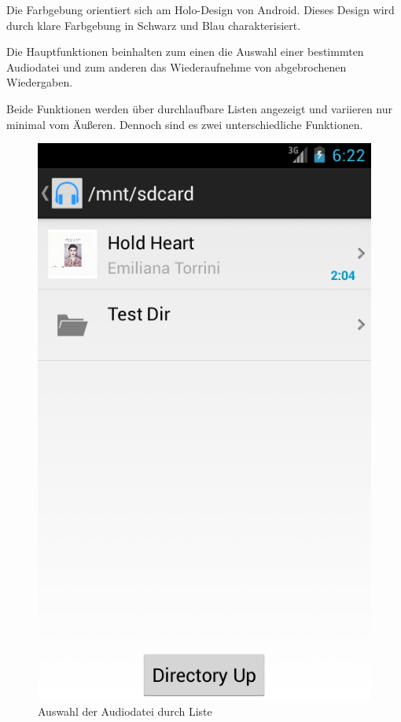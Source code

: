 Die Farbgebung orientiert sich am Holo-Design von Android. Dieses Design wird durch klare Farbgebung in Schwarz und Blau charakterisiert.

Die Hauptfunktionen beinhalten zum einen die Auswahl einer bestimmten Audiodatei und zum anderen das Wiederaufnehme von abgebrochenen Wiedergaben.

Beide Funktionen werden über durchlaufbare Listen angezeigt und variieren nur minimal vom Äußeren. Dennoch sind es zwei unterschiedliche Funktionen.

\begin{figure}[ht!]
\begin{center}
\includegraphics[scale=.5]{images/browsing}
\caption{Auswahl der Audiodatei durch Liste}
\label{browsing}
\end{center}
\end{figure}

